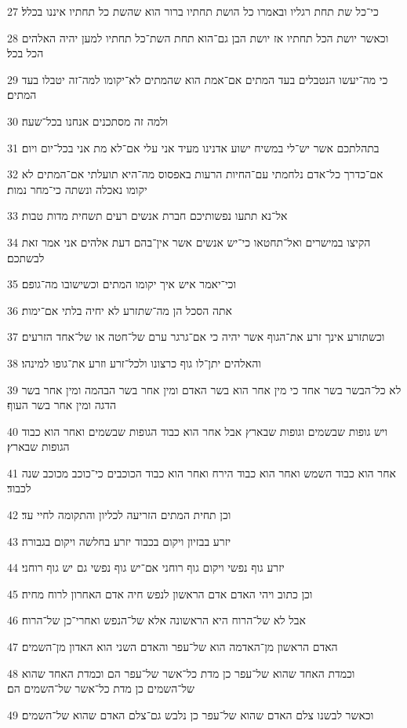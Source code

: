 \par 27 כי־כל שת תחת רגליו ובאמרו כל הושת תחתיו ברור הוא שהשת כל תחתיו איננו בכלל׃
\par 28 וכאשר יושת הכל תחתיו אז יושת הבן גם־הוא תחת השת־כל תחתיו למען יהיה האלהים הכל בכל׃
\par 29 כי מה־יעשו הנטבלים בעד המתים אם־אמת הוא שהמתים לא־יקומו למה־זה יטבלו בעד המתים׃
\par 30 ולמה זה מסתכנים אנחנו בכל־שעה׃
\par 31 בתהלתכם אשר יש־לי במשיח ישוע אדנינו מעיד אני עלי אם־לא מת אני בכל־יום ויום׃
\par 32 אם־כדרך כל־אדם נלחמתי עם־החיות הרעות באפסוס מה־היא תועלתי אם־המתים לא יקומו נאכלה ונשתה כי־מחר נמות׃
\par 33 אל־נא תתעו נפשותיכם חברת אנשים רעים תשחית מדות טבות׃
\par 34 הקיצו במישרים ואל־תחטאו כי־יש אנשים אשר אין־בהם דעת אלהים אני אמר זאת לבשתכם׃
\par 35 וכי־יאמר איש איך יקומו המתים וכשישובו מה־גופם׃
\par 36 אתה הסכל הן מה־שתזרע לא יחיה בלתי אם־ימות׃
\par 37 וכשתזרע אינך זרע את־הגוף אשר יהיה כי אם־גרגר ערם של־חטה או של־אחד הזרעים׃
\par 38 והאלהים יתן־לו גוף כרצונו ולכל־זרע וזרע את־גופו למינהו׃
\par 39 לא כל־הבשר בשר אחד כי מין אחר הוא בשר האדם ומין אחר בשר הבהמה ומין אחר בשר הדגה ומין אחר בשר העוף׃
\par 40 ויש גופות שבשמים וגופות שבארץ אבל אחר הוא כבוד הגופות שבשמים ואחר הוא כבוד הגופות שבארץ׃
\par 41 אחר הוא כבוד השמש ואחר הוא כבוד הירח ואחר הוא כבוד הכוכבים כי־כוכב מכוכב שנה לכבוד׃
\par 42 וכן תחית המתים הזריעה לכליון והתקומה לחיי עד׃
\par 43 יזרע בבזיון ויקום בכבוד יזרע בחלשה ויקום בגבורה׃
\par 44 יזרע גוף נפשי ויקום גוף רוחני אם־יש גוף נפשי גם יש גוף רוחני׃
\par 45 וכן כתוב ויהי האדם אדם הראשון לנפש חיה אדם האחרון לרוח מחיה׃
\par 46 אבל לא של־הרוח היא הראשונה אלא של־הנפש ואחרי־כן של־הרוח׃
\par 47 האדם הראשון מן־האדמה הוא של־עפר והאדם השני הוא האדון מן־השמים׃
\par 48 וכמדת האחד שהוא של־עפר כן מדת כל־אשר של־עפר הם וכמדת האחד שהוא של־השמים כן מדת כל־אשר של־השמים הם׃
\par 49 וכאשר לבשנו צלם האדם שהוא של־עפר כן נלבש גם־צלם האדם שהוא של־השמים׃

